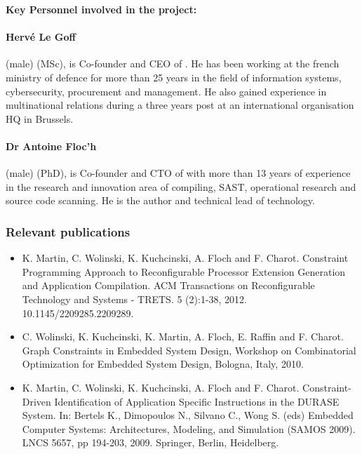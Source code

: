 \documentclass[a4paper,11pt]{article}
\begin{document}
\vspace{10pt}

\vspace{10pt}

\textbf{Key Personnel involved in the project:}

\paragraph{Hervé Le Goff} (male) (MSc), is Co-founder and CEO of \YAGlong{}. He has been working at the french ministry of defence for more than 25 years in the field of information systems, cybersecurity, procurement and management. He also gained experience in multinational relations during a three years post at an international organisation HQ in Brussels.

\vspace{10pt}

\paragraph{Dr Antoine Floc'h} (male) (PhD), is Co-founder and CTO of \YAGlong{} with more than 13 years of experience in the research and innovation area of compiling, SAST, operational research and source code scanning. He is the author and technical lead of \YAGlong{} technology.

\subsubsection*{Relevant publications}
\begin{itemize}
\item K. Martin, C. Wolinski, K. Kuchcinski, A. Floch and F. Charot. Constraint Programming Approach to Reconfigurable Processor Extension Generation and Application Compilation. ACM Transactions on Reconfigurable Technology and Systems - TRETS. 5 (2):1-38, 2012. 10.1145/2209285.2209289.
\item C. Wolinski, K. Kuchcinski, K. Martin, A. Floch, E. Raffin and F. Charot. Graph Constraints in Embedded System Design, Workshop on Combinatorial Optimization for Embedded System Design, Bologna, Italy, 2010.

\item K. Martin, C. Wolinski, K. Kuchcinski, A. Floch and F. Charot. Constraint-Driven Identification of Application Specific Instructions in the DURASE System. 
In: Bertels K., Dimopoulos N., Silvano C., Wong S. (eds) Embedded Computer Systems: Architectures, Modeling, and Simulation (SAMOS 2009). LNCS 5657, pp 194-203, 2009. Springer, Berlin, Heidelberg.
\end{itemize}
\end{document}
